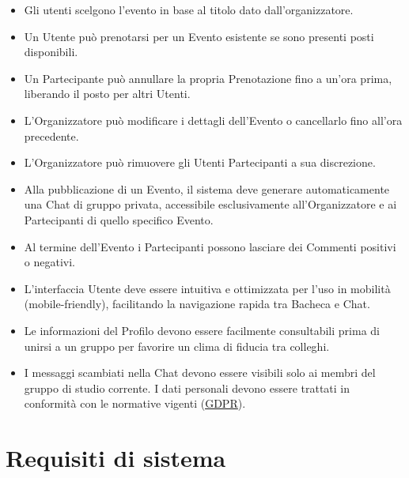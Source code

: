 \documentclass[12pt,a4paper]{report}
\let\oldhref\href
\renewcommand{\href}[2]{\oldhref{#1}{\uline{#2}}}
\begin{document}
\begin{itemize}[leftmargin=*]
    \item Gli utenti scelgono l'evento in base al titolo dato dall'organizzatore.
    \item Un Utente può prenotarsi per un Evento esistente se sono presenti posti disponibili.
    \item Un Partecipante può annullare la propria Prenotazione fino a un'ora prima, liberando il posto per altri Utenti.
    \item L'Organizzatore può modificare i dettagli dell'Evento o cancellarlo fino all'ora precedente.
    \item L'Organizzatore può rimuovere gli Utenti Partecipanti a sua discrezione.
    \item Alla pubblicazione di un Evento, il sistema deve generare automaticamente una Chat di gruppo privata, accessibile esclusivamente all'Organizzatore e ai Partecipanti di quello specifico Evento.
    \item Al termine dell'Evento i Partecipanti possono lasciare dei Commenti positivi o negativi.
    \item L'interfaccia Utente deve essere intuitiva e ottimizzata per l'uso in mobilità (mobile-friendly), facilitando la navigazione rapida tra Bacheca e Chat.
    \item Le informazioni del Profilo devono essere facilmente consultabili prima di unirsi a un gruppo per favorire un clima di fiducia tra colleghi.
    \item I messaggi scambiati nella Chat devono essere visibili solo ai membri del gruppo di studio corrente. I dati personali devono essere trattati in conformità con le normative vigenti (\href{https://gdpr-info.eu/}{GDPR}).
\end{itemize}

\newpage
\section{Requisiti di sistema}
\end{document}
